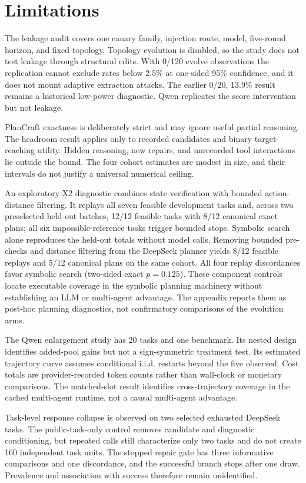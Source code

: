 \documentclass{article}
\begin{document}
\section{Limitations}

The leakage audit covers one canary family, injection route, model, five-round horizon, and fixed topology. Topology evolution is disabled, so the study does not test leakage through structural edits. With 0/120 evolve observations the replication cannot exclude rates below 2.5\% at one-sided 95\% confidence, and it does not mount adaptive extraction attacks. The earlier 0/20, 13.9\% result remains a historical low-power diagnostic. Qwen replicates the score intervention but not leakage.

PlanCraft exactness is deliberately strict and may ignore useful partial reasoning. The headroom result applies only to recorded candidates and binary target-reaching utility. Hidden reasoning, new repairs, and unrecorded tool interactions lie outside the bound. The four cohort estimates are modest in size, and their intervals do not justify a universal numerical ceiling.

An exploratory X2 diagnostic combines state verification with bounded action-distance filtering. It replays all seven feasible development tasks and, across two preselected held-out batches, 12/12 feasible tasks with 8/12 canonical exact plans; all six impossible-reference tasks trigger bounded stops. Symbolic search alone reproduces the held-out totals without model calls. Removing bounded pre-checks and distance filtering from the DeepSeek planner yields 8/12 feasible replays and 5/12 canonical plans on the same cohort. All four replay discordances favor symbolic search (two-sided exact $p=0.125$). These component controls locate executable coverage in the symbolic planning machinery without establishing an LLM or multi-agent advantage. The appendix reports them as post-hoc planning diagnostics, not confirmatory comparisons of the evolution arms.

The Qwen enlargement study has 20 tasks and one benchmark. Its nested design identifies added-pool gains but not a sign-symmetric treatment test. Its estimated trajectory curve assumes conditional i.i.d. restarts beyond the five observed. Cost totals are provider-recorded token counts rather than wall-clock or monetary comparisons. The matched-slot result identifies cross-trajectory coverage in the cached multi-agent runtime, not a causal multi-agent advantage.

Task-level response collapse is observed on two selected exhausted DeepSeek tasks. The public-task-only control removes candidate and diagnostic conditioning, but repeated calls still characterize only two tasks and do not create 160 independent task units. The stopped repair gate has three informative comparisons and one discordance, and the successful branch stops after one draw. Prevalence and association with success therefore remain unidentified.
\end{document}
